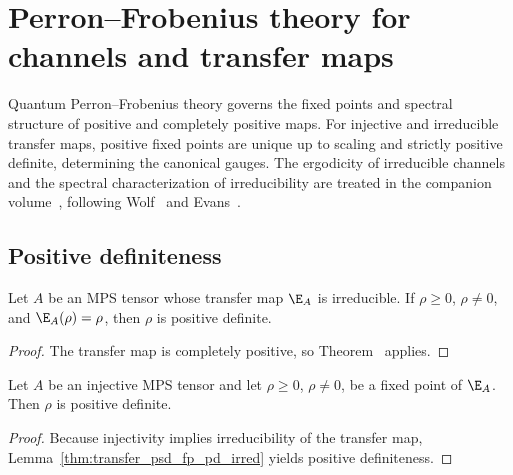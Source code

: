 \chapter{Perron--Frobenius theory for channels and transfer maps}\label{ch:qpf}

Quantum Perron--Frobenius theory governs the fixed points and spectral structure
of positive and completely positive maps. For injective and irreducible transfer
maps, positive fixed points are unique up to scaling and strictly positive
definite, determining the canonical gauges. The ergodicity of irreducible
channels and the spectral characterization of irreducibility are treated in the
companion volume~\cite[``Ces\`aro convergence for irreducible channels'' and
    ``Irreducibility iff the restricted CP spectral
    properties hold'']{QICLean2026Blueprint}, following
Wolf~\cite[Chapter~6]{Wolf2012Quantum} and Evans~\cite{Evans1978Spectral}.


\section{Positive definiteness}


\begin{lemma}
    \label{thm:transfer_psd_fp_pd_irred}
    \leanok
    Let $A$ be an MPS tensor whose transfer map $\E_A$ is irreducible. If
    $\rho\geq0$, $\rho\neq0$, and $\E_A(\rho)=\rho$, then $\rho$ is positive
    definite.
\end{lemma}

\begin{proof}
    \leanok
    The transfer map is completely positive, so
    Theorem~\cite[``PSD fixed point is positive definite --- irreducible version'']{QICLean2026Blueprint} applies.
\end{proof}

\begin{lemma}
    \label{thm:psd_fp_pd}
    \leanok
    Let $A$ be an injective MPS tensor and let $\rho \ge 0$,
    $\rho \neq 0$, be a fixed point of $\E_A$. Then $\rho$ is positive
    definite.
\end{lemma}

\begin{proof}\leanok
    Because injectivity implies irreducibility of the transfer map,
    Lemma~\ref{thm:transfer_psd_fp_pd_irred} yields positive definiteness.
\end{proof}


